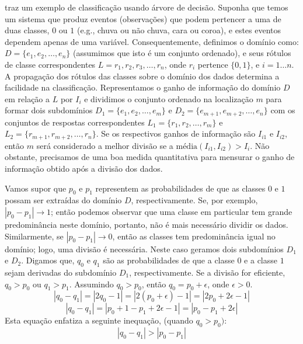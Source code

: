  traz um exemplo de classificação usando
árvore de decisão. Suponha que temos um sistema que produz eventos (observações)
que podem pertencer a uma de duas classes, \(0\) ou \(1\) (e.g., chuva ou não
chuva, cara ou coroa), e estes eventos dependem apenas de uma variável.
Consequentemente, definimos o domínio como: \(D = \{e_1, e_2, \ldots, e_n\}\)
(assumimos que isto é um conjunto ordenado), e seus rótulos de classe
correspondentes \(L = {r_1, r_2, r_3, \ldots, r_n}\), onde \(r_i\) pertence
\(\{0, 1\}\), e \(i = 1 \ldots n\). A propagação dos rótulos das classes sobre o
domínio dos dados determina a facilidade na classificação. Representamos o ganho
de informação do domínio \(D\) em relação a \(L\) por \(I_i\) e dividimos o
conjunto ordenado na localização \(m\) para formar dois subdomínios \(D_1 =
\{e_1, e_2, \ldots, e_m\}\) e \(D_2 = \{e_{m+1}, e_{m+2}, \ldots, e_n\}\) com os
conjuntos de respostas correspondentes \(L_1 = \{r_1, r_2, \ldots, r_m\}\) e
\(L_2 = \{r_{m+1}, r_{m+2}, \ldots, r_n\}\). Se os respectivos ganhos de
informação são \(I_{i1}\) e \(I_{i2}\), então \(m\) será considerado a melhor
divisão se a  \(\text{média}(I_{i1}, I_{i2}) > I_i\). Não obstante, precisamos
de uma boa medida quantitativa para mensurar o ganho de informação obtido após a
divisão dos dados.

Vamos supor que \(p_0\) e \(p_1\) representem as probabilidades de que as
classes \(0\) e \(1\) possam ser extraídas do domínio \(D\), respectivamente.
Se, por exemplo, \(|p_0 - p_1| \to 1\); então podemos observar que uma classe em
particular tem grande predominância neste domínio, portanto, não é mais
necessário dividir os dados. Similarmente, se \(|p_0 - p_1| \to 0\), então as
classes tem predominância igual no domínio; logo, uma divisão é necessária.
Neste caso geramos dois subdomínios \(D_1\) e \(D_2\). Digamos que, \(q_0\) e
\(q_1\) são as probabilidades de que a classe \(0\) e a classe \(1\) sejam
derivadas do subdomínio \(D_1\), respectivamente. Se a divisão for eficiente,
\(q_0 > p_0\) ou \(q_1 > p_1\). Assumindo \(q_0 > p_0\), então \(q_0 = p_0 +
\epsilon\), onde \(\epsilon > 0\).
\[|q_0 - q_1| = |2q_0 - 1| = |2(p_0 + \epsilon) - 1| = |2p_0 + 2\epsilon - 1|\]
\[|q_0 - q_1| = |p_0 + 1 - p_1 + 2\epsilon - 1| = |p_0 - p_1 + 2\epsilon|\]
Esta equação enfatiza a seguinte inequação, (quando \(q_0 > p_0)\):
\[|q_0 - q_1| > |p_0 - p_1|\]



